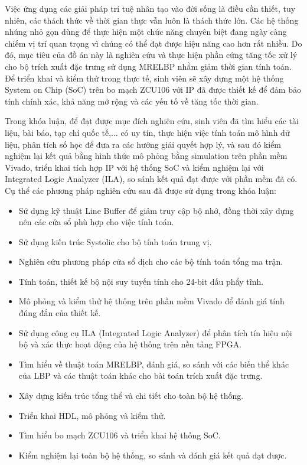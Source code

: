 Việc ứng dụng các giải pháp trí tuệ nhân tạo vào đời sống là điều cần thiết, tuy nhiên, các thách thức về thời gian thực vẫn luôn là thách thức lớn. Các hệ thống nhúng nhỏ gọn dùng để thực hiện một chức năng chuyên biệt đang ngày càng chiếm vị trí quan trọng vì chúng có thể đạt được hiệu năng cao hơn rất nhiều. Do đó, mục tiêu của đồ án này là nghiên cứu và thực hiện phần cứng tăng tốc xử lý cho bộ trích xuất đặc trưng sử dụng MRELBP nhằm giảm thời gian tính toán. Để triển khai và kiểm thử trong thực tế, sinh viên sẽ xây dựng một hệ thống System on Chip (SoC) trên bo mạch ZCU106 với IP đã được thiết kế để đảm bảo tính chính xác, khả năng mở rộng và các yếu tố về tăng tốc thời gian.
\vspace{0.3cm}


\vspace{0.3cm}

Trong khóa luận, để đạt được mục đích nghiên cứu, sinh viên đã tìm
hiểu các tài liệu, bài báo, tạp chí quốc tế,... có uy tín, thực hiện việc tính toán mô hình dữ liệu, phân tích số học để đưa ra các hướng giải quyết hợp lý, và sau đó kiểm nghiệm lại kết quả bằng hình thức mô phỏng bằng simulation trên phần mềm Vivado, triển khai tích hợp IP với hệ thống SoC và kiểm nghiệm lại với Integrated Logic Analyzer (ILA), so sánh kết quả đạt được với phần mềm đã có.  Cụ thể các phương pháp nghiên cứu sau đã được sử dụng trong khóa luận:
\renewcommand{\labelitemi}{$-$}
\begin{itemize}
	\item Sử dụng kỹ thuật Line Buffer để giảm truy cập bộ nhớ, đồng thời xây dựng nên các cửa sổ phù hợp cho việc tính toán.
	\item Sử dụng kiến trúc Systolic cho bộ tính toán trung vị.
	\item Nghiên cứu phương pháp cửa sổ dịch cho các bộ tính toán tổng ma trận.
	\item Tính toán, thiết kế bộ nội suy tuyến tính cho 24-bit dấu phẩy tĩnh.
	\item Mô phỏng và kiểm thử hệ thống trên phần mềm Vivado để đánh giá tính đúng đắn của thiết kế.
	\item Sử dụng công cụ ILA (Integrated Logic Analyzer) để phân tích tín hiệu nội bộ và xác thực hoạt động của hệ thống trên nền tảng FPGA.
	 
\end{itemize} 
\renewcommand{\labelitemi}{$-$}
\begin{itemize}
	\item Tìm hiểu về thuật toán MRELBP, đánh giá, so sánh với các biến thể khác của LBP và các thuật toán khác cho bài toán trích xuất đặc trưng.
	\item Xây dựng kiến trúc tổng thể và chi tiết cho toàn bộ hệ thống.
	\item Triển khai HDL, mô phỏng và kiểm thử.
	\item Tìm hiểu bo mạch ZCU106 và triển khai hệ thống SoC.
	\item Kiểm nghiệm lại toàn bộ hệ thống, so sánh và đánh giá kết quả đạt được.
\end{itemize} 
\vspace{0.3cm}

